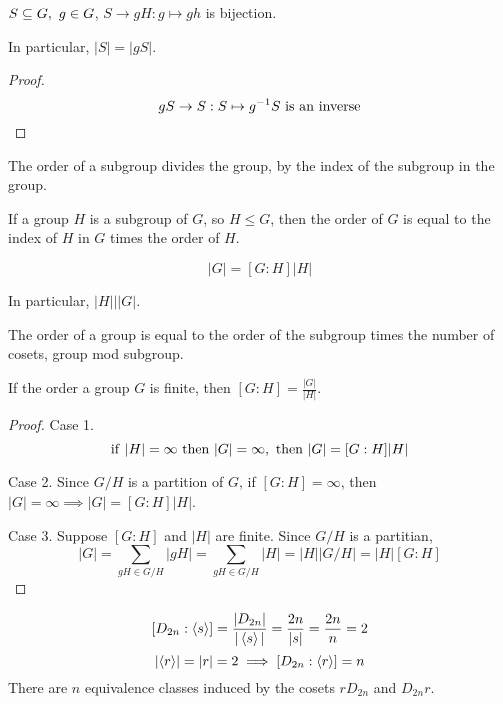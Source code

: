 \documentclass[12pt]{article}
\newcommand{\order}[1]{\left\lvert#1\right\rvert}
\newcommand{\divides}{\mathbin|}
\newcommand\subgroup{\le}
\begin{document}
\bboxlem
\begin{lem}
    \(S\subseteq G,\ g\in G\),
    \(S\to gH : g\mapsto gh\) is bijection.

    In particular, \(|S|=|gS|\).
\end{lem}
\ebox

\bboxproof
\begin{proof}
    \[
        gS\to S:S\mapsto g^{-1}S\ \mathrm{is}\ \mathrm{an\ inverse}
    \]
\end{proof}
\ebox


\bboxthm
\begin{thm}[Lagrange]
    The order of a subgroup divides the group,
    by the index of the subgroup in the group.

    If a group \(H\) is a subgroup of \(G\),
    so \(H\subgroup G\), then the order
    of \(G\) is equal to the index of \(H\)
    in \(G\) times the order of \(H\).

    \[
        |G|=[G:H]|H|
    \]

    In particular, \(|H|\divides|G|\).
\end{thm}
\ebox

The order of a group is equal to the order of
the subgroup times the number of cosets, group mod subgroup.

If the order a group \(G\) is finite, then
\([G:H]=\frac{|G|}{|H|}\).

\bboxproof
\begin{proof}
    Case 1.
    \[
        \iif\ |H|=\infty\
        \tthen\ |G|=\infty,\
        \tthen\ |G|=[G:H]|H|
    \]
    
    Case 2.
    Since \(G/H\) is a partition of \(G\), 
    if \([G:H]=\infty\), then
    \(|G|=\infty\implies|G|=[G:H]|H|\).

    Case 3.
    Suppose \([G:H]\) and \(|H|\) are finite.
    Since \(G/H\) is a partitian,
    \[
        |G|=\sum_{gH\in G/H}|gH|
           =\sum_{gH\in G/H}|H|
           =|H||G/H|
           =|H|[G:H]
    \]
\end{proof}
\ebox

\bboxexam
\begin{exam}
    \[
        [D_{2n}:\left\langle s\right\rangle]
        =\frac{|D_{2n}|}{|\left\langle s\right\rangle|}
        =\frac{2n}{|s|}
        =\frac{2n}n
        =2
    \]
    \[
        \order{\gen{r}}=\order{r}=2
        \implies
        [D_{2n}:\gen{r}]=n
    \]
    There are \(n\) equivalence classes
    induced by the cosets \(rD_{2n}\)
    and \(D_{2n}r\).
\end{exam}
\ebox
\end{document}
